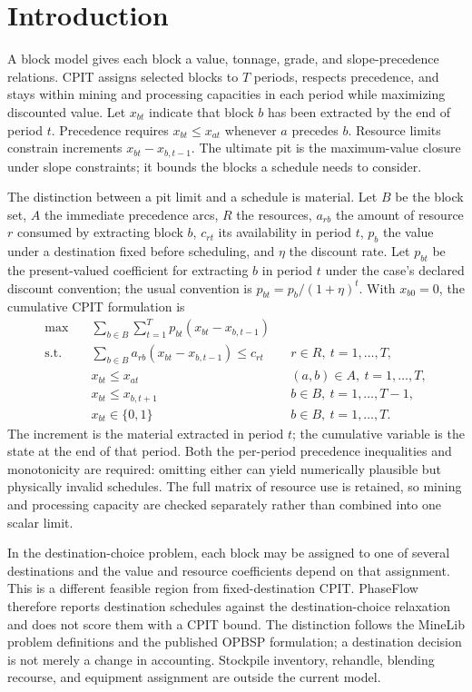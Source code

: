 \documentclass[11pt]{article}
\begin{document}
\section{Introduction}
A block model gives each block a value, tonnage, grade, and slope-precedence relations. CPIT assigns selected blocks to $T$ periods, respects precedence, and stays within mining and processing capacities in each period while maximizing discounted value. Let $x_{bt}$ indicate that block $b$ has been extracted by the end of period $t$. Precedence requires $x_{bt}\leq x_{at}$ whenever $a$ precedes $b$. Resource limits constrain increments $x_{bt}-x_{b,t-1}$. The ultimate pit is the maximum-value closure under slope constraints; it bounds the blocks a schedule needs to consider.

The distinction between a pit limit and a schedule is material. Let $B$ be the block set, $A$ the immediate precedence arcs, $R$ the resources, $a_{rb}$ the amount of resource $r$ consumed by extracting block $b$, $c_{rt}$ its availability in period $t$, $p_b$ the value under a destination fixed before scheduling, and $\eta$ the discount rate. Let $p_{bt}$ be the present-valued coefficient for extracting $b$ in period $t$ under the case's declared discount convention; the usual convention is $p_{bt}=p_b/(1+\eta)^t$. With $x_{b0}=0$, the cumulative CPIT formulation is
\begin{align}
 \max\quad & \sum_{b\in B}\sum_{t=1}^{T}p_{bt}(x_{bt}-x_{b,t-1}) \\
 \text{s.t.}\quad & \sum_{b\in B}a_{rb}(x_{bt}-x_{b,t-1})\leq c_{rt} && r\in R,\ t=1,\ldots,T,\\
 &x_{bt}\leq x_{at} && (a,b)\in A,\ t=1,\ldots,T,\\
 &x_{bt}\leq x_{b,t+1} && b\in B,\ t=1,\ldots,T-1,\\
 &x_{bt}\in\{0,1\} && b\in B,\ t=1,\ldots,T.
\end{align}
The increment is the material extracted in period $t$; the cumulative variable is the state at the end of that period. Both the per-period precedence inequalities and monotonicity are required: omitting either can yield numerically plausible but physically invalid schedules. The full matrix of resource use is retained, so mining and processing capacity are checked separately rather than combined into one scalar limit.

In the destination-choice problem, each block may be assigned to one of several destinations and the value and resource coefficients depend on that assignment. This is a different feasible region from fixed-destination CPIT. PhaseFlow therefore reports destination schedules against the destination-choice relaxation and does not score them with a CPIT bound. The distinction follows the MineLib problem definitions and the published OPBSP formulation; a destination decision is not merely a change in accounting. Stockpile inventory, rehandle, blending recourse, and equipment assignment are outside the current model.
\end{document}
